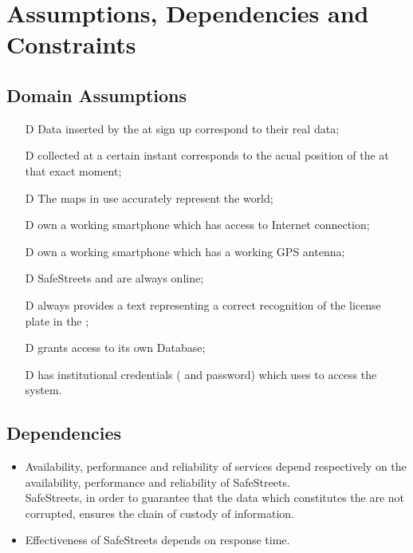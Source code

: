 \documentclass[../../rasd.tex]{subfiles}
\begin{document}
\section{Assumptions, Dependencies and Constraints}
	\subsection{Domain Assumptions}
	 	\begin{itemize}
	 		\item[D\subs{1}]Data inserted by the  at sign up correspond to their real data;
	 		\item[D\subs{2}] collected at a certain instant corresponds to the acual position of the  at that exact moment;
	 		\item[D\subs{3}]The maps in use accurately represent the world;
	 		\item[D\subs{4}] own a working smartphone which has access to Internet connection;
	 		\item[D\subs{5}] own a working smartphone which has a working GPS antenna;
	 		\item[D\subs{6}]SafeStreets and  are always online;
	 		\item[D\subs{7}] always provides a text representing a correct recognition of the license plate in the ;
	 		\item[D\subs{8}] grants access to its own  Database;
	 		\item[D\subs{9}] has institutional credentials ( and password) which uses to access the system.
	 	\end{itemize}
 	
 	\subsection{Dependencies}
 		\begin{itemize}
 		\item Availability, performance and reliability of services depend respectively on the availability, performance and reliability of SafeStreets. \\
 		SafeStreets, in order to guarantee that the data which constitutes the  are not corrupted, ensures the chain of custody of information. 
 		\item Effectiveness of SafeStreets depends on  response time. 
 
 		\end{itemize}
\end{document}
